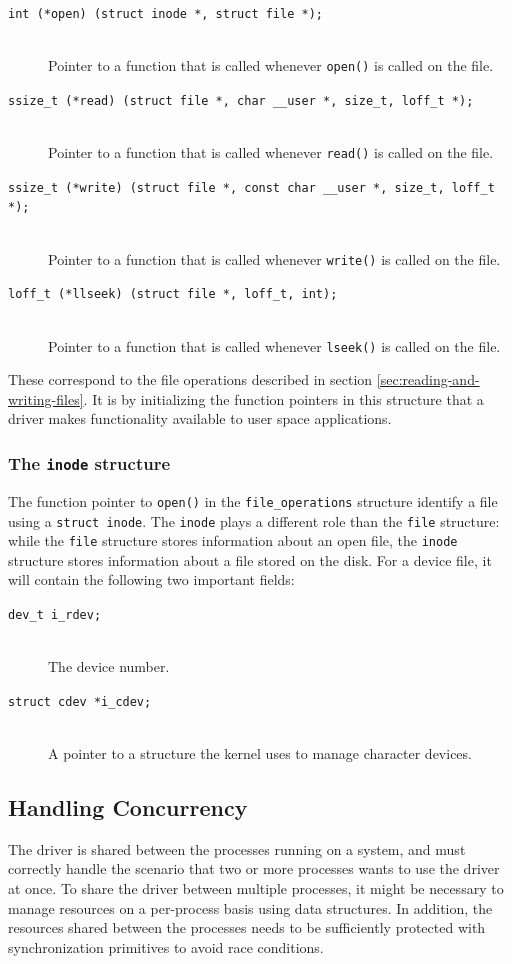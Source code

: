 \begin{description}
  \item[\texttt{int (*open) (struct inode *, struct file *);}] \hfill \\
    Pointer to a function that is called whenever \texttt{open()} is called on the file.
  \item[\texttt{ssize\_t (*read) (struct file *, char \_\_user *, size\_t, loff\_t *);}] \hfill \\
    Pointer to a function that is called whenever \texttt{read()} is called on the file.
  \item[\texttt{ssize\_t (*write) (struct file *, const char \_\_user *, size\_t, loff\_t *);}] \hfill \\
    Pointer to a function that is called whenever \texttt{write()} is called on the file.
  \item[\texttt{loff\_t (*llseek) (struct file *, loff\_t, int);}] \hfill \\
    Pointer to a function that is called whenever \texttt{lseek()} is called on the file.
\end{description}
These correspond to the file operations described in section \ref{sec:reading-and-writing-files}. 
It is by initializing the function pointers in this structure that a driver makes functionality available to user space applications.

\subsubsection{The \texttt{inode} structure}
The function pointer to \texttt{open()} in the \texttt{file\_operations} structure identify a file using a \texttt{struct inode}. The \texttt{inode} plays a different role than the \texttt{file} structure: while the \texttt{file} structure stores information about an open file, the \texttt{inode} structure stores information about a file stored on the disk. For a device file, it will contain the following two important fields:
\begin{description}
  \item[\texttt{dev\_t i\_rdev;}] \hfill \\
    The device number.
  \item[\texttt{struct cdev *i\_cdev;}] \hfill \\
    A pointer to a structure the kernel uses to manage character devices.
\end{description}


\subsection{Handling Concurrency}
The driver is shared between the processes running on a system, and must correctly handle the scenario that two or more processes wants to use the driver at once. To share the driver between multiple processes, it might be necessary to manage resources on a per-process basis using data structures. In addition, the resources shared between the processes needs to be sufficiently protected with synchronization primitives to avoid race conditions.

